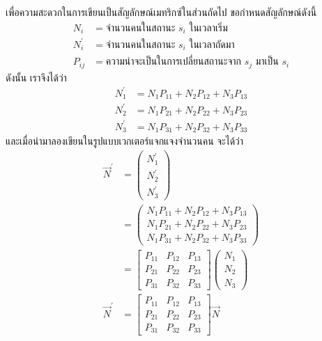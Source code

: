 เพื่อความสะดวกในการเขียนเป็นสัญลักษณ์เมทริกซ์ในส่วนถัดไป ขอกำหนดสัญลักษณ์ดังนี้
\begin{align*}
    N_i &= \text{จำนวนคนในสถานะ $s_i$ ในเวลาเริ่ม}\\
    N_i^{\prime} &= \text{จำนวนคนในสถานะ $s_i$ ในเวลาถัดมา}\\
    P_{ij} &= \text{ความน่าจะเป็นในการเปลี่ยนสถานะจาก $s_j$ มาเป็น $s_i$}
\end{align*}
ดังนั้น เราจึงได้ว่า
\begin{align*}
    N^{\prime}_1 &= N_1 P_{11} + N_2 P_{12} + N_3 P_{13}\\
    N^{\prime}_2 &= N_1 P_{21} + N_2 P_{22} + N_3 P_{23}\\
    N^{\prime}_3 &= N_1 P_{31} + N_2 P_{32} + N_3 P_{33}
\end{align*}
และเมื่อนำมาลองเขียนในรูปแบบเวกเตอร์แจกแจงจำนวนคน จะได้ว่า
\begin{align*}
    \vec{N}^{\prime} &= \begin{pmatrix}N^{\prime}_1 \\ N^{\prime}_2 \\ N^{\prime}_3\end{pmatrix}\\
                  &= \begin{pmatrix}
                  N_1 P_{11} + N_2 P_{12} + N_3 P_{13} \\ 
                  N_1 P_{21} + N_2 P_{22} + N_3 P_{23} \\ 
                  N_1 P_{31} + N_2 P_{32} + N_3 P_{33}\end{pmatrix}\\
                  &= \begin{bmatrix}P_{11} & P_{12} & P_{13} \\ 
                  P_{21} & P_{22} & P_{23} \\
                 P_{31} & P_{32} & P_{33} \end{bmatrix}\begin{pmatrix}N_1 \\ N_2 \\ N_3\end{pmatrix}\\
    \vec{N}^{\prime} &= \begin{bmatrix}P_{11} & P_{12} & P_{13} \\ 
                  P_{21} & P_{22} & P_{23} \\
                 P_{31} & P_{32} & P_{33} \end{bmatrix}\vec{N}
\end{align*}

